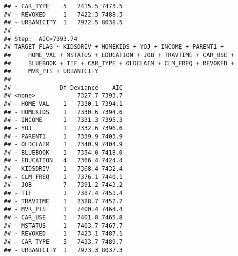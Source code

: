 \documentclass[]{article}
\begin{document}
\begin{verbatim}
## - CAR_TYPE    5   7415.5 7473.5
## - REVOKED     1   7422.3 7488.3
## - URBANICITY  1   7972.5 8038.5
## 
## Step:  AIC=7393.74
## TARGET_FLAG ~ KIDSDRIV + HOMEKIDS + YOJ + INCOME + PARENT1 + 
##     HOME_VAL + MSTATUS + EDUCATION + JOB + TRAVTIME + CAR_USE + 
##     BLUEBOOK + TIF + CAR_TYPE + OLDCLAIM + CLM_FREQ + REVOKED + 
##     MVR_PTS + URBANICITY
## 
##              Df Deviance    AIC
## <none>            7327.7 7393.7
## - HOME_VAL    1   7330.1 7394.1
## - HOMEKIDS    1   7330.6 7394.6
## - INCOME      1   7331.3 7395.3
## - YOJ         1   7332.6 7396.6
## - PARENT1     1   7339.9 7403.9
## - OLDCLAIM    1   7340.9 7404.9
## - BLUEBOOK    1   7354.0 7418.0
## - EDUCATION   4   7366.4 7424.4
## - KIDSDRIV    1   7368.4 7432.4
## - CLM_FREQ    1   7376.1 7440.1
## - JOB         7   7391.2 7443.2
## - TIF         1   7387.4 7451.4
## - TRAVTIME    1   7388.7 7452.7
## - MVR_PTS     1   7400.4 7464.4
## - CAR_USE     1   7401.8 7465.8
## - MSTATUS     1   7403.7 7467.7
## - REVOKED     1   7423.1 7487.1
## - CAR_TYPE    5   7433.7 7489.7
## - URBANICITY  1   7973.3 8037.3
\end{verbatim}
\end{document}
